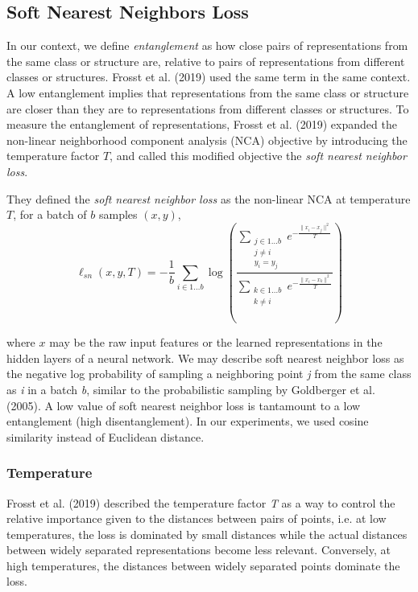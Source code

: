 \documentclass[conference]{IEEEtran}
\begin{document}
\subsection{Soft Nearest Neighbors Loss}
In our context, we define \textit{entanglement} as how close pairs of representations from the same class or structure are, relative to pairs of representations from different classes or structures. Frosst et al. (2019)\cite{frosst2019analyzing} used the same term in the same context. A low entanglement implies that representations from the same class or structure are closer than they are to representations from different classes or structures. To measure the entanglement of representations, Frosst et al. (2019)\cite{frosst2019analyzing} expanded the non-linear neighborhood component analysis (NCA)\cite{salakhutdinov2007learning} objective by introducing the temperature factor $T$, and called this modified objective the \textit{soft nearest neighbor loss}.

They defined the \textit{soft nearest neighbor loss} as the non-linear NCA at temperature $T$, for a batch of $b$ samples $(x, y)$,
\begin{equation}\label{eq:snnl}
    \ell_{sn}(x, y, T) = -\dfrac{1}{b} \sum_{i \in 1 \dots b} \log \left( \dfrac{\sum\limits_{\substack{j \in 1 \dots b \\ j \neq i \\ y_{i} = y_{j}}} e^{-\frac{\|x_{i} - x_{j}\|^{2}}{T}} }{\sum\limits_{\substack{k \in 1 \dots b \\ k \neq i}} e^{-\frac{\|x_{i} - x_{k}\|^{2}}{T}}} \right)
\end{equation}

where $x$ may be the raw input features or the learned representations in the hidden layers of a neural network. We may describe soft nearest neighbor loss as the negative log probability of sampling a neighboring point \textit{j} from the same class as \textit{i} in a batch \textit{b}, similar to the probabilistic sampling by Goldberger et al. (2005)\cite{goldberger2005neighbourhood}. A low value of soft nearest neighbor loss is tantamount to a low entanglement (high disentanglement). In our experiments, we used cosine similarity instead of Euclidean distance.
\subsubsection{Temperature} Frosst et al. (2019)\cite{frosst2019analyzing} described the temperature factor \textit{T} as a way to control the relative importance given to the distances between pairs of points, i.e. at low temperatures, the loss is dominated by small distances while the actual distances between widely separated representations become less relevant. Conversely, at high temperatures, the distances between widely separated points dominate the loss.
\end{document}
